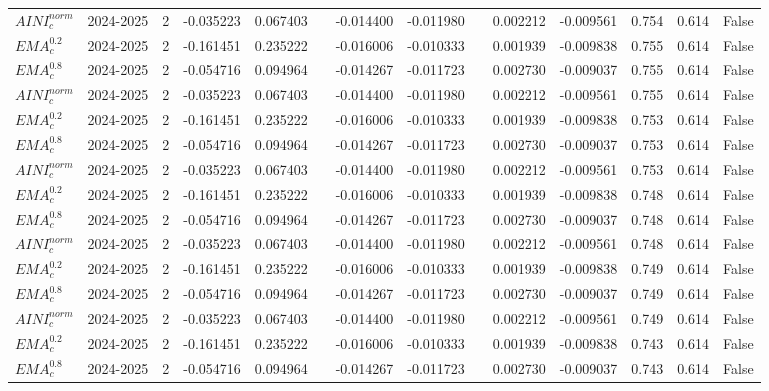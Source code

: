 \begin{tabular}{@{}llrrrrrrrrrlll@{}}
$AINI^{norm}_{c}$ & 2024-2025 & 2 & -0.035223 & 0.067403 &  & -0.014400 & -0.011980 &  & 0.002212 & -0.009561 & 0.754 & 0.614 & False \\
$EMA^{0.2}_{c}$ & 2024-2025 & 2 & -0.161451 & 0.235222 &  & -0.016006 & -0.010333 &  & 0.001939 & -0.009838 & 0.755 & 0.614 & False \\
$EMA^{0.8}_{c}$ & 2024-2025 & 2 & -0.054716 & 0.094964 &  & -0.014267 & -0.011723 &  & 0.002730 & -0.009037 & 0.755 & 0.614 & False \\
$AINI^{norm}_{c}$ & 2024-2025 & 2 & -0.035223 & 0.067403 &  & -0.014400 & -0.011980 &  & 0.002212 & -0.009561 & 0.755 & 0.614 & False \\
$EMA^{0.2}_{c}$ & 2024-2025 & 2 & -0.161451 & 0.235222 &  & -0.016006 & -0.010333 &  & 0.001939 & -0.009838 & 0.753 & 0.614 & False \\
$EMA^{0.8}_{c}$ & 2024-2025 & 2 & -0.054716 & 0.094964 &  & -0.014267 & -0.011723 &  & 0.002730 & -0.009037 & 0.753 & 0.614 & False \\
$AINI^{norm}_{c}$ & 2024-2025 & 2 & -0.035223 & 0.067403 &  & -0.014400 & -0.011980 &  & 0.002212 & -0.009561 & 0.753 & 0.614 & False \\
$EMA^{0.2}_{c}$ & 2024-2025 & 2 & -0.161451 & 0.235222 &  & -0.016006 & -0.010333 &  & 0.001939 & -0.009838 & 0.748 & 0.614 & False \\
$EMA^{0.8}_{c}$ & 2024-2025 & 2 & -0.054716 & 0.094964 &  & -0.014267 & -0.011723 &  & 0.002730 & -0.009037 & 0.748 & 0.614 & False \\
$AINI^{norm}_{c}$ & 2024-2025 & 2 & -0.035223 & 0.067403 &  & -0.014400 & -0.011980 &  & 0.002212 & -0.009561 & 0.748 & 0.614 & False \\
$EMA^{0.2}_{c}$ & 2024-2025 & 2 & -0.161451 & 0.235222 &  & -0.016006 & -0.010333 &  & 0.001939 & -0.009838 & 0.749 & 0.614 & False \\
$EMA^{0.8}_{c}$ & 2024-2025 & 2 & -0.054716 & 0.094964 &  & -0.014267 & -0.011723 &  & 0.002730 & -0.009037 & 0.749 & 0.614 & False \\
$AINI^{norm}_{c}$ & 2024-2025 & 2 & -0.035223 & 0.067403 &  & -0.014400 & -0.011980 &  & 0.002212 & -0.009561 & 0.749 & 0.614 & False \\
$EMA^{0.2}_{c}$ & 2024-2025 & 2 & -0.161451 & 0.235222 &  & -0.016006 & -0.010333 &  & 0.001939 & -0.009838 & 0.743 & 0.614 & False \\
$EMA^{0.8}_{c}$ & 2024-2025 & 2 & -0.054716 & 0.094964 &  & -0.014267 & -0.011723 &  & 0.002730 & -0.009037 & 0.743 & 0.614 & False \\

\end{tabular}
